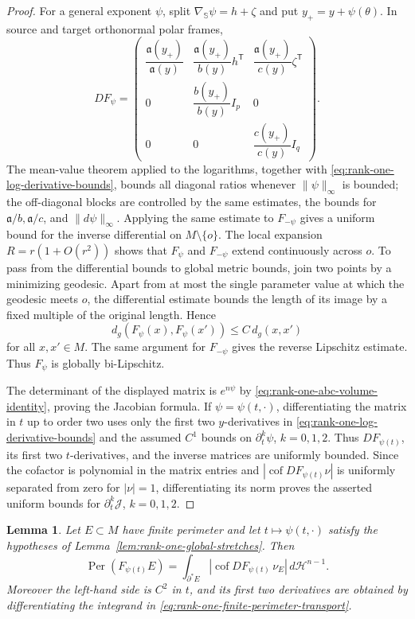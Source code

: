 \documentclass[11pt,reqno]{amsart}
\numberwithin{equation}{section}
\newtheorem{lemma}[theorem]{Lemma}
\theoremstyle{definition}
\theoremstyle{remark}
\newcommand{\Per}{\operatorname{Per}}
\newcommand{\cof}{\operatorname{cof}}
\begin{document}
\begin{proof}
For a general exponent $\psi$, split
$\nabla_{\mathbb S}\psi=h+\zeta$ and put $y_+=y+\psi(\theta)$.  In source and
target orthonormal polar frames,
\[
DF_\psi=
\begin{pmatrix}
\dfrac{\mathfrak a(y_+)}{\mathfrak a(y)}
&\dfrac{\mathfrak a(y_+)}{b(y)}h^{\mathsf T}
&\dfrac{\mathfrak a(y_+)}{c(y)}\zeta^{\mathsf T}\\[0.8em]
0&\dfrac{b(y_+)}{b(y)}I_p&0\\[0.8em]
0&0&\dfrac{c(y_+)}{c(y)}I_q
\end{pmatrix}.
\]
The mean-value theorem applied to the logarithms, together with
\eqref{eq:rank-one-log-derivative-bounds}, bounds all diagonal ratios whenever
$\|\psi\|_{\infty}$ is bounded; the off-diagonal blocks are controlled by the
same estimates, the bounds for $\mathfrak a/b,\mathfrak a/c$, and
$\|d\psi\|_\infty$.  Applying the same estimate to $F_{-\psi}$ gives a uniform
bound for the inverse differential on $M\setminus\{o\}$.  The local expansion
$R=r(1+O(r^2))$ shows that $F_\psi$ and $F_{-\psi}$ extend continuously across
$o$.  To pass from the differential bounds to global metric bounds, join two
points by a minimizing geodesic.  Apart from at most the single parameter value
at which the geodesic meets $o$, the differential estimate bounds the length of
its image by a fixed multiple of the original length.  Hence
\[
d_g(F_\psi(x),F_\psi(x'))\le C\,d_g(x,x')
\]
for all $x,x'\in M$.  The same argument for $F_{-\psi}$ gives the reverse
Lipschitz estimate.  Thus $F_\psi$ is globally bi-Lipschitz.

The determinant of the displayed matrix is $e^{n\psi}$ by
\eqref{eq:rank-one-abc-volume-identity}, proving the Jacobian formula.  If
$\psi=\psi(t,\cdot)$, differentiating the matrix in $t$ up to order two uses
only the first two $y$-derivatives in
\eqref{eq:rank-one-log-derivative-bounds} and the assumed $C^1$ bounds on
$\partial_t^k\psi$, $k=0,1,2$.  Thus
$DF_{\psi(t)}$, its first two $t$-derivatives, and the inverse matrices are
uniformly bounded.  Since the cofactor is polynomial in the matrix entries and
$|\cof DF_{\psi(t)}\nu|$ is uniformly separated from zero for $|\nu|=1$,
differentiating its norm proves the asserted uniform bounds for
$\partial_t^k\mathcal J$, $k=0,1,2$.
\end{proof}

\begin{lemma}
\label{lem:rank-one-finite-perimeter-transport}
Let $E\subset M$ have finite perimeter and let
$t\mapsto\psi(t,\cdot)$ satisfy the hypotheses of
Lemma~\ref{lem:rank-one-global-stretches}.  Then
\begin{equation}
\Per(F_{\psi(t)}E)
=
\int_{\partial^*E}
\left|\cof DF_{\psi(t)}\,\nu_E\right|
\,d\mathcal H^{n-1}.
\label{eq:rank-one-finite-perimeter-transport}
\end{equation}
Moreover the left-hand side is $C^2$ in $t$, and its first two derivatives are
obtained by differentiating the integrand in
\eqref{eq:rank-one-finite-perimeter-transport}.
\end{lemma}
\end{document}
